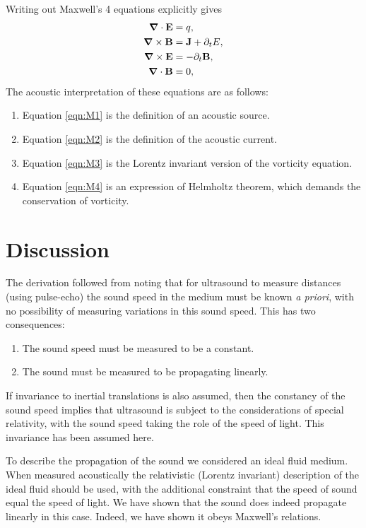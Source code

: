 \documentclass[10pt, fleqn,final,showtrims,oldfontcommands]{article} %
\newcommand{\sub}[1]{\begin{subequations}#1\end{subequations}}
\newcommand{\eqa}[1]{\begin{align}#1\end{align}}
\newcommand{\eqnref}[1]{\ref{eqn:#1}}
\renewcommand{\d}{\partial}
\newcommand{\del}{\nabla}
\newcommand{\vdel}{ \mbox{\boldmath $\del$}}
\newcommand{\dt}{{\d_t}}
\newcommand{\vJ}{\vect J}
\newcommand{\vE}{\vect E}
\newcommand{\vB}{\vect B}
\newcommand{\vect}[1]{\mathbf{#1}}
\newcommand{\nlist}[1]
	   {  
	     \begin{enumerate}
	       #1
	     \end{enumerate} 
	   }
\begin{document}
Writing out Maxwell's 4 equations explicitly gives
\sub{
\eqa{
 \vdel \cdot \vE &= q,\label{eqn:M1}  \\ 
 \vdel \times \vB &= \vJ + \dt E, \label{eqn:M2}\\
 \vdel \times \vE &= -\dt\vB\label{eqn:M3},\\
 \vdel \cdot \vB &= 0\label{eqn:M4},
}
}
The acoustic interpretation of these equations are as follows:
\nlist{
\item Equation \eqnref{M1} is the definition of an acoustic source.
\item Equation \eqnref{M2} is the definition of the acoustic current.
\item Equation \eqnref{M3} is the Lorentz invariant version of the vorticity equation.
\item Equation \eqnref{M4} is an expression of Helmholtz theorem, which demands the conservation of vorticity.
}



\section{Discussion}\label{sec:discussion}



The derivation followed from noting that for ultrasound to measure distances (using pulse-echo) 
the sound speed in the medium must be known {\em a priori}, 
with no possibility of measuring variations in this sound speed.
This has two consequences:
\begin{enumerate}
  \item The sound speed must be measured to be a constant.
  \item The sound must be measured to be propagating linearly.
\end{enumerate}
If invariance to inertial translations is also assumed,
then the constancy of the sound speed  implies that 
ultrasound is subject to the considerations of special relativity,
with the sound speed taking the role of the speed of light.
This invariance has been assumed here.

To describe the propagation of the sound we considered an ideal fluid medium.
When measured acoustically the relativistic (Lorentz invariant) description of the ideal fluid should be used,
with the additional constraint that the speed of sound equal the speed of light.
We have shown that the sound does indeed propagate linearly in this case.
Indeed, we have shown it obeys Maxwell's relations.
\end{document}
